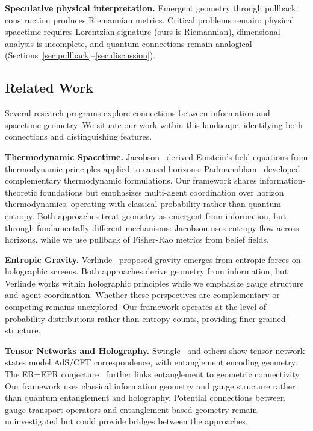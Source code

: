 \documentclass[11pt]{article}
\begin{document}
\textbf{Speculative physical interpretation.} Emergent geometry through pullback construction produces Riemannian metrics. Critical problems remain: physical spacetime requires Lorentzian signature (ours is Riemannian), dimensional analysis is incomplete, and quantum connections remain analogical (Sections~\ref{sec:pullback}--\ref{sec:discussion}).

\subsection{Related Work}
\label{sec:related}

Several research programs explore connections between information and spacetime geometry. We situate our work within this landscape, identifying both connections and distinguishing features.

\textbf{Thermodynamic Spacetime.} Jacobson~\cite{Jacobson1995} derived Einstein's field equations from thermodynamic principles applied to causal horizons. Padmanabhan~\cite{Padmanabhan2010} developed complementary thermodynamic formulations. Our framework shares information-theoretic foundations but emphasizes multi-agent coordination over horizon thermodynamics, operating with classical probability rather than quantum entropy. Both approaches treat geometry as emergent from information, but through fundamentally different mechanisms: Jacobson uses entropy flow across horizons, while we use pullback of Fisher-Rao metrics from belief fields.

\textbf{Entropic Gravity.} Verlinde~\cite{Verlinde2011} proposed gravity emerges from entropic forces on holographic screens. Both approaches derive geometry from information, but Verlinde works within holographic principles while we emphasize gauge structure and agent coordination. Whether these perspectives are complementary or competing remains unexplored. Our framework operates at the level of probability distributions rather than entropy counts, providing finer-grained structure.

\textbf{Tensor Networks and Holography.} Swingle~\cite{Swingle2012} and others show tensor network states model AdS/CFT correspondence, with entanglement encoding geometry. The ER=EPR conjecture~\cite{MaldacenaSusskind2013} further links entanglement to geometric connectivity. Our framework uses classical information geometry and gauge structure rather than quantum entanglement and holography. Potential connections between gauge transport operators and entanglement-based geometry remain uninvestigated but could provide bridges between the approaches.
\end{document}
